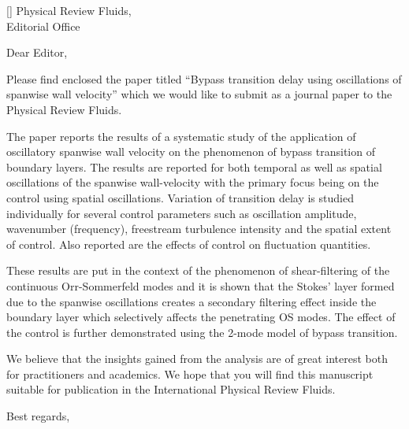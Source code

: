 \documentclass[english]{kthletter}
\date{Stockholm, \today}
\begin{document}
\begin{letter}[]%
  {
  	Physical Review Fluids,\\
  	Editorial Office\\
  	}

\opening{Dear Editor,}

Please find enclosed the paper titled “Bypass transition delay using oscillations of spanwise wall velocity” which we would like to submit as a journal paper to the Physical Review Fluids.

The paper reports the results of a systematic study of the application of oscillatory spanwise wall velocity on the phenomenon of bypass transition of boundary layers. The results are reported for both temporal as well as spatial oscillations of the spanwise wall-velocity with the primary focus being on the control using spatial oscillations. Variation of transition delay is studied individually for several control parameters such as oscillation amplitude, wavenumber (frequency), freestream turbulence intensity and the spatial extent of control. Also reported are the effects of control on fluctuation quantities.

These results are put in the context of the phenomenon of shear-filtering of the continuous Orr-Sommerfeld modes and it is shown that the Stokes' layer formed due to the spanwise oscillations creates a secondary filtering effect inside the boundary layer which selectively affects the penetrating OS modes. The effect of the control is further demonstrated using the 2-mode model of bypass transition.

We believe that the insights gained from the analysis are of great interest both for practitioners and academics. We hope that you will find this manuscript suitable for publication in the International Physical Review Fluids.

\closing{Best regards,}



\end{letter}
\end{document}
